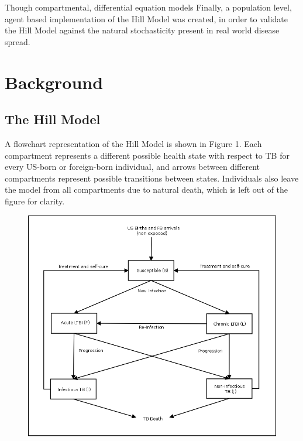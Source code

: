 \documentclass{amsart}
\begin{document}
Though compartmental, differential equation models 
Finally, a
population level, agent based implementation of the Hill Model was created, in
order to validate the Hill Model against the natural stochasticity present in
real world disease spread. 

\section{Background}

\subsection{The Hill Model}
A flowchart representation of the Hill Model is shown in Figure 1.  Each compartment
represents a different possible health state with respect to TB for every 
US-born or foreign-born individual, and arrows between different compartments
represent possible transitions between states.  Individuals also leave the model 
from all compartments due to natural death, which is left out of the figure for clarity.  \\

\begin{figure}
\includegraphics[scale=0.25]{figures/HillModelFlowChart.png}
\end{figure}
\end{document}
